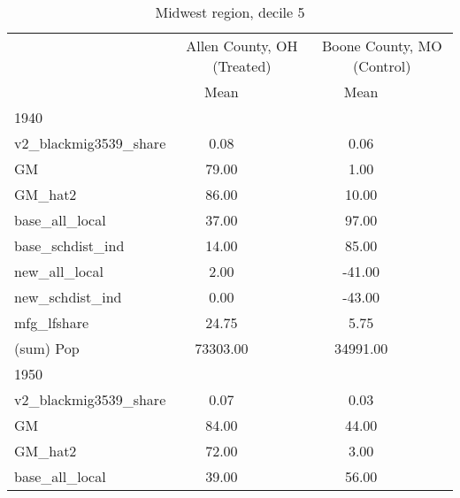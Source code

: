 \begin{table}[htbp]\centering
\def\sym#1{\ifmmode^{#1}\else\(^{#1}\)\fi}
\caption{Midwest region, decile 5 \label{tab1}}
\begin{tabular}{l*{2}{ccc}}
\toprule
                    &\multicolumn{3}{c}{Allen County, OH (Treated)}&\multicolumn{3}{c}{Boone County, MO (Control)}\\
                    &        Mean&            &            &        Mean&            &            \\
\midrule
1940                &            &            &            &            &            &            \\
v2\_blackmig3539\_share&        0.08&            &            &        0.06&            &            \\
GM                  &       79.00&            &            &        1.00&            &            \\
GM\_hat2             &       86.00&            &            &       10.00&            &            \\
base\_all\_local      &       37.00&            &            &       97.00&            &            \\
base\_schdist\_ind    &       14.00&            &            &       85.00&            &            \\
new\_all\_local       &        2.00&            &            &      -41.00&            &            \\
new\_schdist\_ind     &        0.00&            &            &      -43.00&            &            \\
mfg\_lfshare         &       24.75&            &            &        5.75&            &            \\
(sum) Pop           &    73303.00&            &            &    34991.00&            &            \\
\midrule
1950                &            &            &            &            &            &            \\
v2\_blackmig3539\_share&        0.07&            &            &        0.03&            &            \\
GM                  &       84.00&            &            &       44.00&            &            \\
GM\_hat2             &       72.00&            &            &        3.00&            &            \\
base\_all\_local      &       39.00&            &            &       56.00&            &            \\

\end{tabular}
\end{table}
